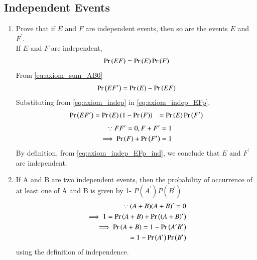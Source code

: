 \subsection{Independent Events}
\renewcommand{\theequation}{\theenumi}
\begin{enumerate}[label=\thesubsection.\arabic*.,ref=\thesubsection.\theenumi]



\item Prove that if $E$ and $F$ are independent events, then so are the events $E$ and $F^{\prime}$.\\
\solution  If $E$ and $F$ are independent,
\begin{align}
\Pr\left(EF\right) = \Pr\left(E\right)\Pr\left(F\right)
\label{eq:axiom_indep}
\end{align}
From 
\eqref{eq:axiom_sum_AB0}
%
\begin{align}
\Pr\left(EF^{\prime}\right) =  \Pr\left(E\right) - \Pr\left(EF\right)
\label{eq:axiom_indep_EFp}
\end{align}
Substituting from \eqref{eq:axiom_indep} in \eqref{eq:axiom_indep_EFp},
%
\begin{align}
\Pr\left(EF^{\prime}\right) &=  \Pr\left(E\right) \left(1- \Pr\left(F\right)\right)
&= \Pr\left(E\right) \Pr\left(F^{\prime}\right)
\label{eq:axiom_indep_EFp_ind}
\end{align}
%
\begin{align}
\because FF^{\prime} = 0, F + F^{\prime} = 1
\\
\implies \Pr\left(F\right)+\Pr\left(F^{\prime}\right) = 1
\label{eq:axiom_FFp}
\end{align}
By definition, from \eqref{eq:axiom_indep_EFp_ind}, we conclude that $E$ and $F^{\prime}$ are independent.
\item If A and B are two independent events, then the probability of occurrence of at least one of A and B is given by 1- $P(A^{\prime}) P(B^{\prime})$\\
\solution 
\begin{align}
\because (A+B)(A+B)^{\prime} = 0
\\
\implies 1 = \Pr\left(A+B\right) + \Pr\left(\left(A+B\right)^{\prime}\right)
\\
\implies \Pr\left(A+B\right) = 1 - \Pr\left(A^{\prime}B^{\prime}\right) 
\\
= 1 - \Pr\left(A^{\prime}\right)\Pr\left(B^{\prime}\right) 
\end{align}
using the definition of independence.
\end{enumerate}
